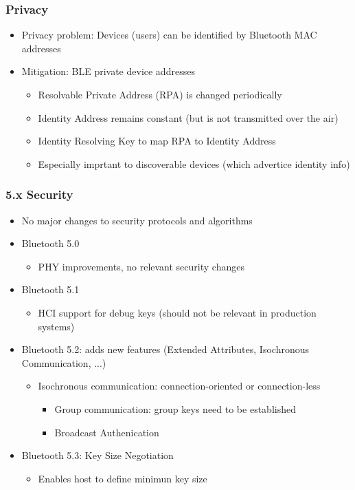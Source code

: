 \subsubsection{Privacy}
\begin{itemize}
  \item Privacy problem: Devices (users) can be identified by Bluetooth MAC addresses
  \item Mitigation: BLE private device addresses 
    \begin{itemize}
      \item Resolvable Private Address (RPA) is changed periodically
      \item Identity Address remains constant (but is not transmitted over the air) 
      \item Identity Resolving Key to map RPA to Identity Address 
      \item Especially imprtant to discoverable devices (which advertice identity info) 
    \end{itemize}
\end{itemize}

\subsubsection{5.x Security}
\begin{itemize}
  \item No major changes to security protocols and algorithms
  \item Bluetooth 5.0 
    \begin{itemize}
      \item PHY improvements, no relevant security changes
    \end{itemize}
  \item Bluetooth 5.1 
    \begin{itemize}
      \item HCI support for debug keys (should not be relevant in production systems)
    \end{itemize}
  \item Bluetooth 5.2: adds new features (Extended Attributes, Isochronous Communication, ...)
    \begin{itemize}
      \item Isochronous communication: connection-oriented or connection-less
        \begin{itemize}
          \item Group communication: group keys need to be established
          \item Broadcast Authenication 
        \end{itemize}
    \end{itemize}
  \item Bluetooth 5.3: Key Size Negotiation 
    \begin{itemize}
      \item Enables host to define minimun key size
    \end{itemize}
\end{itemize}
